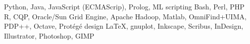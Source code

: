 
        {Python, Java, JavaScript (ECMA\-Scrip), Prolog, ML}
    {scripting}
        {Bash, Perl, PHP}
        {R, CQP, Oracle/Sun Grid Engine, Apache Hadoop, Matlab, OmniFind+UIMA,
        PDP++, Octave, Prot\'{e}g\'{e}}
    {design}
        {\LaTeX, gnuplot, Inkscape, Scribus, InDesign, Illustrator, Photoshop, GIMP}%

